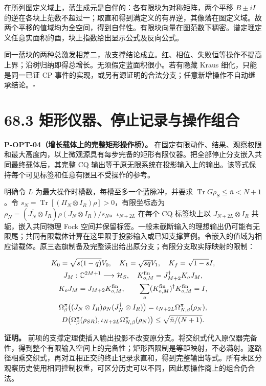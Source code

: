 \documentclass[
  11pt,
  oneside]{book}
\begin{document}
在所列图定义域上，蓝生成元是自伴的：各有限块为对称矩阵，两个平移
\(B± iI\)
的逆在各块上范数不超过一；取直和得到满定义的有界逆，其像落在图定义域。故两个平移的值域均为全空间，得到自伴性。有限块向量在图范数下稠密。谱定理定义任意实面积的酉，块上指数给出显示公式及反向公式。

同一蓝块的两种总激发相差二，故支撑结论成立。红、相位、失败恒等操作不提高上界；沿树归纳即得总增长。无须假定蓝面积很小。若有隐藏
Kraus 细化，只能是同一已证 CP
事件的实现，或另有源证明的合法分支；任意新增操作不自动继承结论。\(\square\)

\section{68.3 矩形仪器、停止记录与操作组合}

\protect\hypertarget{p-opt-04}{}{}

\textbf{P-OPT-04（增长载体上的完整矩形操作桥）。}
在固定有限动作、结果、观察权限和最大高度内，以上微观源具有每步完备的矩形有限仪器。把全部停止分支嵌入共同最终载体后，其完整
CQ
输出等于原无限系统在投影输入上的输出。该等式保持每个可见标签和任意有限且不受操作的参考。

明确令 \(L\) 为最大操作时槽数，每槽至多一个蓝脉冲，并要求
\(\operatorname{Tr}G\rho_S\le\bar n<N+1\)。令
\(s_N=\operatorname{Tr}[(\Pi_N\otimes I_R)\rho]>0\)，有限坐标态为
\(\rho_N=(J_N^\dagger\otimes I_R)\rho(J_N\otimes I_R)/s_N\)。\(\iota_{N+2L}\)
在每个 CQ 标签块上以 \(J_{N+2L}\otimes I_R\) 共轭，嵌入共同物理 Fock
空间并保留标签。一般未截断输入的理想输出仍可能有无限尾；共同有限载体计算在这里限于投影输入或已知支撑算例。令嵌入的值域为相应谱载体。原三态旗制备及完整读出给出原分支；有限分支取实际映射的限制：

\[
\begin{gathered}
K_0=\sqrt{s(1-q)}V_0,\quad K_1=\sqrt{sq}V_1,\quad K_f=\sqrt{1-s}I,\\
J_M:\mathbb C^{2M+1}\longrightarrow\mathcal H_S,\quad
K_{o,M}^{\rm fin}=J_{M+2}^\dagger K_oJ_M,\\
K_oJ_M=J_{M+2}K_{o,M}^{\rm fin},\qquad
\sum_o(K_{o,M}^{\rm fin})^\dagger K_{o,M}^{\rm fin}=I,\\
\Omega_\beta^\pi\bigl((J_N\otimes I_R)\rho_N(J_N^\dagger\otimes I_R)\bigr)
=\iota_{N+2L}\Omega_{N,\beta}^\pi(\rho_N),\\
D\bigl(\Omega_\beta^\pi(\rho_{SR}),
\iota_{N+2L}\Omega_{N,\beta}^\pi(\rho_N)\bigr)
\le\sqrt{\bar n/(N+1)}.
\end{gathered}
\]

\textbf{证明。}
前项的支撑定理使插入输出投影不改变原分支。将交织式代入原仪器完备性，得到整个有限输入空间上的完备性；矩形酉限制是等距映射，不必满射。逐路径相乘交织式，再对互相正交的终止记录求直和，得到完整输出等式。所有未区分观察历史使用相同控制权重，可区分历史可以不同，因此原操作商上的组合仍合法。
\end{document}
